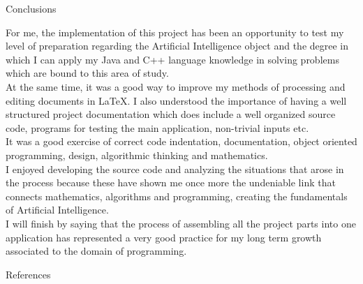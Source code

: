 \documentclass[12pt, a4paper]{article}
\begin{document}
\newpage
\vspace{25mm}
\centering
\large 
Conclusions

\small
\vspace{30mm}
\begin{flushleft}

\hspace{5mm}For me, the implementation of this project has been an opportunity to test my level of preparation regarding the Artificial Intelligence object and the degree in which I can apply my Java and C++ language knowledge in solving problems which are bound to this area of study.
\\
\vspace{3mm}
\hspace{5mm}At the same time, it was a good way to improve my methods of processing and editing documents in LaTeX. I also understood the importance of having a well structured project documentation which does include a well organized source code, programs for testing the main application, non-trivial inputs etc.
\\
\vspace{3mm}
\hspace{5mm}It was a good exercise of correct code indentation, documentation, object oriented programming, design, algorithmic thinking and mathematics.
\\
\vspace{3mm}
\hspace{5mm}I enjoyed developing the source code and analyzing the situations that arose in the process because these have shown me once more the undeniable link that connects mathematics, algorithms and programming, creating the fundamentals of Artificial Intelligence.
\\
\vspace{3mm}
\hspace{5mm}I will finish by saying that the process of assembling all the project parts into one application has represented a very good practice for my long term growth associated to the domain of programming.

\end{flushleft}

\newpage
\vspace{10mm}
\centering
\large 
References
\end{document}
